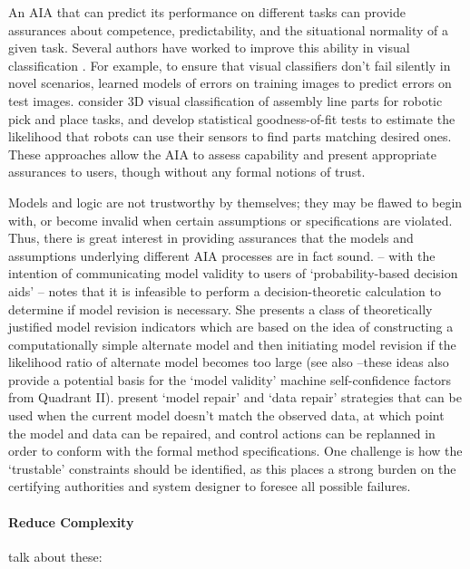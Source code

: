 An AIA that can predict its performance on different tasks can provide assurances about competence, predictability, and the situational normality of a given task. Several authors have worked to improve this ability in visual classification \cite{Zhang2014-he,Gurau2016-hs,Churchill2015-ei,Kaipa2015-hy}. 
For example, to ensure that visual classifiers don't fail silently in novel scenarios, 
\citet{Zhang2014-he} learned models of errors on training images to predict errors on test images. 
\citet{Kaipa2015-hy} consider 3D visual classification of assembly line parts for robotic pick and place tasks, and develop statistical goodness-of-fit tests to estimate the likelihood that robots can use their sensors to find parts matching desired ones. %
These approaches allow the AIA to assess capability and present appropriate assurances to users, though without any formal notions of trust. 

Models and logic are not trustworthy by themselves; they may be flawed to begin with, or become invalid when certain assumptions or specifications are violated. Thus, there is great interest in providing assurances that the models and assumptions underlying different AIA processes are in fact sound. \citet{Laskey1991-mf} -- with the intention of communicating model validity to users of `probability-based decision aids' -- notes that it is infeasible to perform a decision-theoretic calculation to determine if model revision is necessary. 
She presents a class of theoretically justified model revision indicators which are based on the idea of constructing a computationally simple alternate model and then initiating model revision if the likelihood ratio of alternate model becomes too large (see also \citet{Zagorecki2015-qy,Habbema1976-xd} --these ideas also provide a potential basis for the `model validity' machine self-confidence factors from Quadrant II).
\citet{Ghosh2016-dl}  present `model repair' and `data repair' strategies that can be used when the current model doesn't match the observed data, at which point the model and data can be repaired, and control actions can be replanned in order to conform with the formal method specifications. One challenge is how the `trustable' constraints should be identified, as this places a strong burden on the certifying authorities and system designer to foresee all possible failures.

\paragraph{Reduce Complexity} \label{sec:reduce_complexity}
talk about these: \citet{Liu2017-xw, Strumbelj2018-ou, Pynadath2018-ck, Abdollahi2018-uw, Robnik-Sikonja2018-jz, Browne2018-me, Huang2017-lk, Wang2018-br, Hayes2017-nt, Huang2017-zt, Olah2018-rp, Kuhn1997-qc, Rouse1986-dz, Swartout1983-ko, Wang2016-id, Kaniarasu2013-ho, Wallace2001-fm, Aitken2016-cv, Lacave2002-cu, Ribeiro2016-uc}

